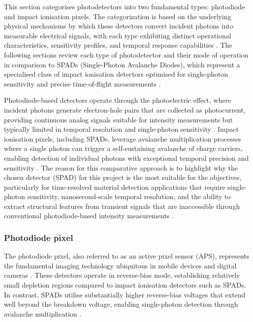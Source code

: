 \documentclass[12pt,a4paper,oneside]{report}
\begin{document}
This section categorises photodetectors into two fundamental types: photodiode and impact ionisation pixels. The categorization is based on the underlying physical mechanisms by which these detectors convert incident photons into measurable electrical signals, with each type exhibiting distinct operational characteristics, sensitivity profiles, and temporal response capabilities \cite{bass2010}. The following sections review each type of photodetector and their mode of operation in comparison to SPADs (Single-Photon Avalanche Diodes), which represent a specialised class of impact ionisation detectors optimised for single-photon sensitivity and precise time-of-flight measurements \cite{piron2020,gyongy2022}.

Photodiode-based detectors operate through the photoelectric effect, where incident photons generate electron-hole pairs that are collected as photocurrent, providing continuous analog signals suitable for intensity measurements but typically limited in temporal resolution and single-photon sensitivity \cite{bass2010}. Impact ionisation pixels, including SPADs, leverage avalanche multiplication processes where a single photon can trigger a self-sustaining avalanche of charge carriers, enabling detection of individual photons with exceptional temporal precision and sensitivity \cite{piron2020}. The reason for this comparative approach is to highlight why the chosen detector (SPAD) for this project is the most suitable for the objectives, particularly for time-resolved material detection applications that require single-photon sensitivity, nanosecond-scale temporal resolution, and the ability to extract structural features from transient signals that are inaccessible through conventional photodiode-based intensity measurements \cite{piron2020,gyongy2022}.

\subsubsection{Photodiode pixel}
\label{subsubsec:photodiode_pixel}

The photodiode pixel, also referred to as an active pixel sensor (APS), represents the fundamental imaging technology ubiquitous in mobile devices and digital cameras \cite{bass2010}. These detectors operate in reverse-bias mode, establishing relatively small depletion regions compared to impact ionisation detectors such as SPADs. In contrast, SPADs utilise substantially higher reverse-bias voltages that extend well beyond the breakdown voltage, enabling single-photon detection through avalanche multiplication \cite{piron2020}.
\end{document}
